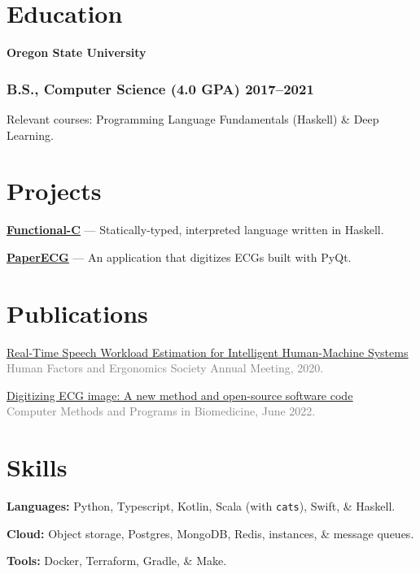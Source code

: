 \documentclass[10pt]{article} %
\let\defaultref\href
\renewcommand{\href}[2]{%
  \defaultref{#1}{\ul{#2}}%
}
\renewcommand{\emph}[1]{%
  \textcolor{gray}{#1}%
}
\begin{document}
\begin{paracol}{2}
\raggedright

\hypertarget{education}{%
\section{Education}\label{education}}

\textbf{Oregon State University}

\hypertarget{b.s.-computer-science-4.0-gpa-20172021}{%
\subsubsection{B.S., Computer Science (4.0 GPA)
2017--2021}\label{b.s.-computer-science-4.0-gpa-20172021}}

Relevant courses: Programming Language Fundamentals (Haskell) \& Deep
Learning.

\hypertarget{projects}{%
\section{Projects}\label{projects}}

\textbf{\href{https://github.com/julianfortune/CS381Project}{Functional-C}}
--- Statically-typed, interpreted language written in Haskell.

\textbf{\href{https://github.com/Tereshchenkolab/paper-ecg}{PaperECG}}
--- An application that digitizes ECGs built with PyQt.

\hypertarget{publications}{%
\section{Publications}\label{publications}}

\vspace{1pt}

\href{https://doi.org/10.1177/1071181320641076}{Real-Time Speech
Workload Estimation for Intelligent Human-Machine Systems}\\
\emph{Human Factors and Ergonomics Society Annual Meeting, 2020.}

\href{https://doi.org/10.1101/2021.07.13.21260461}{Digitizing ECG image:
A new method and open-source software code}\\
\emph{Computer Methods and Programs in Biomedicine, June 2022.}

\hypertarget{skills}{%
\section{Skills}\label{skills}}

\textbf{Languages:} Python, Typescript, Kotlin, Scala (with
\texttt{cats}), Swift, \& Haskell.

\textbf{Cloud:} Object storage, Postgres, MongoDB, Redis, instances, \&
message queues.

\textbf{Tools:} Docker, Terraform, Gradle, \& Make.

\end{paracol}

\end{document}
